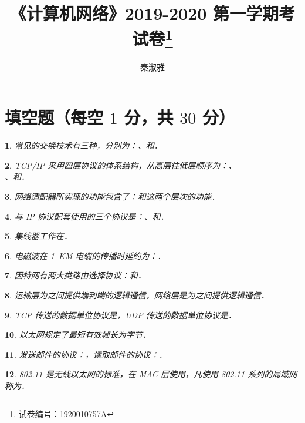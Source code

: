 \documentclass{ctexart}
\title{《计算机网络》2019-2020 第一学期考试卷\thanks{试卷编号：1920010757A}}
\author{秦淑雅}
\theoremstyle{change}
\newtheorem{ti}{}[section]
\def\hua{\uline{\hspace*{\fill}}}
\begin{document}
\pagestyle{plain}
\maketitle
\section{填空题（每空 $1$ 分，共 $30$ 分）}
\begin{ti}
	常见的交换技术有三种，分别为：\hua、\hua 和\hua．
\end{ti}

\begin{ti}
	TCP/IP 采用四层协议的体系结构，从高层往低层顺序为：\hua、\\\hua、\hua 和\hua．
\end{ti}

\begin{ti}
	网络适配器所实现的功能包含了：\hua 和\hua 这两个层次的功能．
\end{ti}

\begin{ti}
	与 IP 协议配套使用的三个协议是：\hua、\hua 和\hua．
\end{ti}

\begin{ti}
	集线器工作在\hua．
\end{ti}

\begin{ti}
	电磁波在 \SI{1}{KM} 电缆的传播时延约为：\hua．
\end{ti}

\begin{ti}
	因特网有两大类路由选择协议：\hua 和\hua．
\end{ti}

\begin{ti}
	运输层为\hua 之间提供端到端的逻辑通信，网络层是为\hua 之间提供逻辑通信．
\end{ti}

\begin{ti}
	TCP 传送的数据单位协议是\hua，UDP 传送的数据单位协议是\hua．
\end{ti}

\begin{ti}
	以太网规定了最短有效帧长为\hua 字节．
\end{ti}

\begin{ti}
	发送邮件的协议：\hua，读取邮件的协议：\hua．
\end{ti}

\begin{ti}
	802.11 是无线以太网的标准，在 MAC 层使用\hua，凡使用 802.11 系列的局域网称为\hua．
\end{ti}
\end{document}
